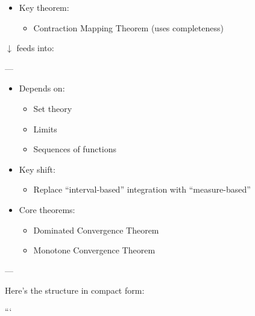 \documentclass[12pt,a4paper]{report}
\begin{document}
\begin{description}
\begin{itemize}
    \item Key theorem:

		\begin{itemize}
        \item Contraction Mapping Theorem (uses completeness)
		\end{itemize}
	\end{itemize}

$\downarrow$ feeds into:

---

\item {}

	\begin{itemize}
    \item Depends on:

		\begin{itemize}
        \item Set theory
        \item Limits
        \item Sequences of functions
		\end{itemize}

    \item Key shift:

		\begin{itemize}
        \item Replace “interval-based” integration with “measure-based”
		\end{itemize}

    \item Core theorems:

		\begin{itemize}
        \item Dominated Convergence Theorem
        \item Monotone Convergence Theorem
		\end{itemize}
	\end{itemize}

---

\item {}

Here’s the structure in compact form:

```


\end{description}
\end{document}
